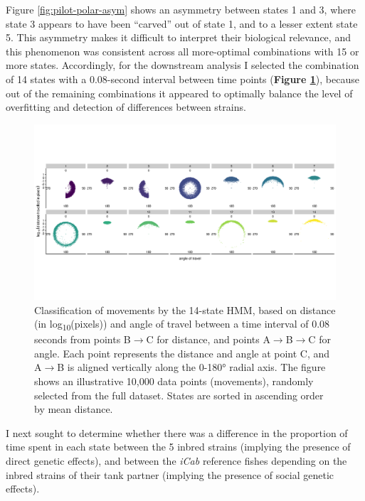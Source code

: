 \documentclass[
]{book}
\begin{document}
Figure \ref{fig:pilot-polar-asym} shows an asymmetry between states 1 and 3, where state 3 appears to have been ``carved'' out of state 1, and to a lesser extent state 5. This asymmetry makes it difficult to interpret their biological relevance, and this phenomenon was consistent across all more-optimal combinations with 15 or more states. Accordingly, for the downstream analysis I selected the combination of 14 states with a 0.08-second interval between time points (\textbf{Figure \ref{fig:pilot-polar}}), because out of the remaining combinations it appeared to optimally balance the level of overfitting and detection of differences between strains.



\begin{figure}
\includegraphics[width=1\linewidth]{figs/pilot/polar_all_dge} \caption{Classification of movements by the 14-state HMM, based on distance (in log\textsubscript{10}(pixels)) and angle of travel between a time interval of 0.08 seconds from points B\(\rightarrow\)C for distance, and points A\(\rightarrow\)B\(\rightarrow\)C for angle. Each point represents the distance and angle at point C, and A\(\rightarrow\)B is aligned vertically along the 0-180° radial axis. The figure shows an illustrative 10,000 data points (movements), randomly selected from the full dataset. States are sorted in ascending order by mean distance.}\label{fig:pilot-polar}
\end{figure}

I next sought to determine whether there was a difference in the proportion of time spent in each state between the 5 inbred strains (implying the presence of direct genetic effects), and between the \emph{iCab} reference fishes depending on the inbred strains of their tank partner (implying the presence of social genetic effects).
\end{document}
